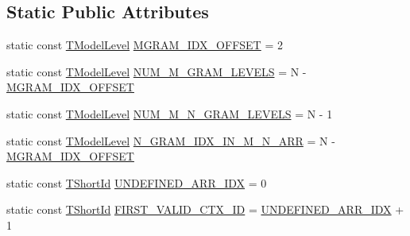 \subsection*{Static Public Attributes}
\begin{DoxyCompactItemize}
\item 
static const \hyperlink{namespaceuva_1_1smt_1_1tries_a20577a44b3a42d26524250634379b7cb}{T\+Model\+Level} \hyperlink{classuva_1_1smt_1_1tries_1_1_generic_trie_base_a3ceb750bc8fcbf2f40fc937ae4c789db}{M\+G\+R\+A\+M\+\_\+\+I\+D\+X\+\_\+\+O\+F\+F\+S\+E\+T} = 2
\item 
static const \hyperlink{namespaceuva_1_1smt_1_1tries_a20577a44b3a42d26524250634379b7cb}{T\+Model\+Level} \hyperlink{classuva_1_1smt_1_1tries_1_1_generic_trie_base_ab98011d7a6af68f21be35bb0870fd1d4}{N\+U\+M\+\_\+\+M\+\_\+\+G\+R\+A\+M\+\_\+\+L\+E\+V\+E\+L\+S} = N -\/ \hyperlink{classuva_1_1smt_1_1tries_1_1_generic_trie_base_a3ceb750bc8fcbf2f40fc937ae4c789db}{M\+G\+R\+A\+M\+\_\+\+I\+D\+X\+\_\+\+O\+F\+F\+S\+E\+T}
\item 
static const \hyperlink{namespaceuva_1_1smt_1_1tries_a20577a44b3a42d26524250634379b7cb}{T\+Model\+Level} \hyperlink{classuva_1_1smt_1_1tries_1_1_generic_trie_base_a8d4621d497f16295a5cb6ee7b69c7904}{N\+U\+M\+\_\+\+M\+\_\+\+N\+\_\+\+G\+R\+A\+M\+\_\+\+L\+E\+V\+E\+L\+S} = N -\/ 1
\item 
static const \hyperlink{namespaceuva_1_1smt_1_1tries_a20577a44b3a42d26524250634379b7cb}{T\+Model\+Level} \hyperlink{classuva_1_1smt_1_1tries_1_1_generic_trie_base_ae81010be1d7bee9ee0a292ecf1a4bcf5}{N\+\_\+\+G\+R\+A\+M\+\_\+\+I\+D\+X\+\_\+\+I\+N\+\_\+\+M\+\_\+\+N\+\_\+\+A\+R\+R} = N -\/ \hyperlink{classuva_1_1smt_1_1tries_1_1_generic_trie_base_a3ceb750bc8fcbf2f40fc937ae4c789db}{M\+G\+R\+A\+M\+\_\+\+I\+D\+X\+\_\+\+O\+F\+F\+S\+E\+T}
\item 
static const \hyperlink{namespaceuva_1_1smt_1_1hashing_adcf22e1982ad09d3a63494c006267469}{T\+Short\+Id} \hyperlink{classuva_1_1smt_1_1tries_1_1_generic_trie_base_a85d9088db3cde6a38327199da579f968}{U\+N\+D\+E\+F\+I\+N\+E\+D\+\_\+\+A\+R\+R\+\_\+\+I\+D\+X} = 0
\item 
static const \hyperlink{namespaceuva_1_1smt_1_1hashing_adcf22e1982ad09d3a63494c006267469}{T\+Short\+Id} \hyperlink{classuva_1_1smt_1_1tries_1_1_generic_trie_base_afa0212a846983432cdb8def9a34e1cfb}{F\+I\+R\+S\+T\+\_\+\+V\+A\+L\+I\+D\+\_\+\+C\+T\+X\+\_\+\+I\+D} = \hyperlink{classuva_1_1smt_1_1tries_1_1_generic_trie_base_a85d9088db3cde6a38327199da579f968}{U\+N\+D\+E\+F\+I\+N\+E\+D\+\_\+\+A\+R\+R\+\_\+\+I\+D\+X} + 1
\end{DoxyCompactItemize}
